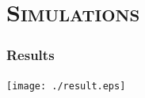 \documentclass[xcolor=x11names,compress]{beamer}
\renewcommand{\(}{\begin{columns}}
\renewcommand{\)}{\end{columns}}
\newcommand{\<}[1]{\begin{column}{#1}}
\renewcommand{\>}{\end{column}}
\begin{document}

\section{\scshape Simulations}

\begin{frame}
\frametitle{Results}
\centering \texttt{[image: ./result.eps]}
\end{frame}
\end{document}
